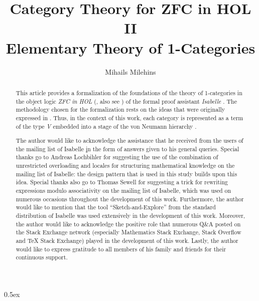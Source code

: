 \documentclass[11pt,a4paper,fleqn]{article}
\begin{document}
\title{Category Theory for ZFC in HOL II\\Elementary Theory of 1-Categories} 
\author{Mihails Milehins}
\maketitle

\newpage
\begin{abstract}
This article provides a formalization of the foundations of the theory 
of 1-categories in the object logic \textit{ZFC in HOL} 
(\cite{paulson_zermelo_2019}, also see \cite{barkaoui_partizan_2006}) of the 
formal proof assistant \textit{Isabelle} \cite{paulson_natural_1986}.
The methodology chosen for the formalization
rests on the ideas that were originally expressed in 
\cite{feferman_set-theoretical_1969}. 
Thus, in the context of this work, each category
is represented as a term of the type \textit{V} 
embedded into a stage of the von Neumann hierarchy 
\cite{takeuti_introduction_1971}.
\end{abstract}

\newpage

\renewcommand{\abstractname}{Acknowledgements}
\begin{abstract}
The author would like to acknowledge the assistance that he received from 
the users of the mailing list of Isabelle 
\href{https://lists.cam.ac.uk/mailman/listinfo/cl-isabelle-users}
in the form of answers given to his general queries. Special thanks
go to Andreas Lochbihler for suggesting the use of the combination 
of unrestricted overloading and locales for structuring mathematical 
knowledge on the mailing list of Isabelle: the design pattern that is 
used in this study builds upon this idea. Special thanks also go to
Thomas Sewell for suggesting a trick for rewriting 
expressions modulo associativity on the mailing list of Isabelle,
which was used on numerous occasions throughout the development
of this work. Furthermore, the author
would like to mention that the tool ``Sketch-and-Explore''
\cite{haftmann_sketch-and-explore_2021}
from the standard distribution of Isabelle was used extensively in the
development of this work. Moreover, the author would like 
to acknowledge the positive role that numerous Q\&A posted on the 
Stack Exchange network (especially Mathematics Stack Exchange, 
Stack Overflow and TeX Stack Exchange)
played in the development of this work. 
Lastly, the author would like to express gratitude to all members of his family 
and friends for their continuous support.
\end{abstract}

\newpage

\tableofcontents

\newpage

\parindent 0pt\parskip 0.5ex



\newpage


\end{document}
